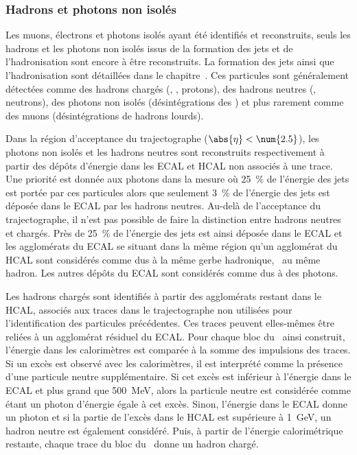 \subsubsection{Hadrons et photons non isolés}
Les muons, électrons et photons isolés ayant été identifiés et reconstruits, seuls les hadrons et les photons non isolés issus de la formation des jets et de l'hadronisation sont encore à être reconstruits.
La formation des jets ainsi que l'hadronisation sont détaillées dans le chapitre~.
Ces particules sont généralement détectées comme des hadrons chargés (\pionpm, \Kaonpm, protons), des hadrons neutres (\Kaonlong, neutrons), des photons non isolés (désintégrations des \pionnull) et plus rarement comme des muons (désintégrations de hadrons lourds).
\par Dans la région d'acceptance du trajectographe ($\abs{\eta}<\num{2.5}$), les photons non isolés et les hadrons neutres sont reconstruits respectivement à partir des dépôts d'énergie dans les ECAL et HCAL non associés à une trace.
Une priorité est donnée aux photons dans la mesure où \SI{25}{\%} de l'énergie des jets est portée par ces particules alors que seulement \SI{3}{\%} de l'énergie des jets est déposée dans le ECAL par les hadrons neutres.
Au-delà de l'acceptance du trajectographe, il n'est pas possible de faire la distinction entre hadrons neutres et chargés.
Près de \SI{25}{\%} de l'énergie des jets est ainsi déposée dans le ECAL et les agglomérats du ECAL se situant dans la même région qu'un agglomérat du HCAL sont considérés comme dus à la même gerbe hadronique, \ie\ au même hadron.
Les autres dépôts du ECAL sont considérés comme dus à des photons.
\par Les hadrons chargés sont identifiés à partir des agglomérats restant dans le HCAL, associés aux traces dans le trajectographe non utilisées pour l'identification des particules précédentes.
Ces traces peuvent elles-mêmes être reliées à un agglomérat résiduel du ECAL.
Pour chaque bloc du \PF\ ainsi construit, l'énergie dans les calorimètres est comparée à la somme des impulsions des traces.
Si un excès est observé avec les calorimètres, il est interprété comme la présence d'une particule neutre supplémentaire.
Si cet excès est inférieur à l'énergie dans le ECAL et plus grand que \SI{500}{\MeV}, alors la particule neutre est considérée comme étant un photon d'énergie égale à cet excès.
Sinon, l'énergie dans le ECAL donne un photon et si la partie de l'excès dans le HCAL est supérieure à \SI{1}{\GeV}, un hadron neutre est également considéré.
Puis, à partir de l'énergie calorimétrique restante, chaque trace du bloc du \PF\ donne un hadron chargé.
